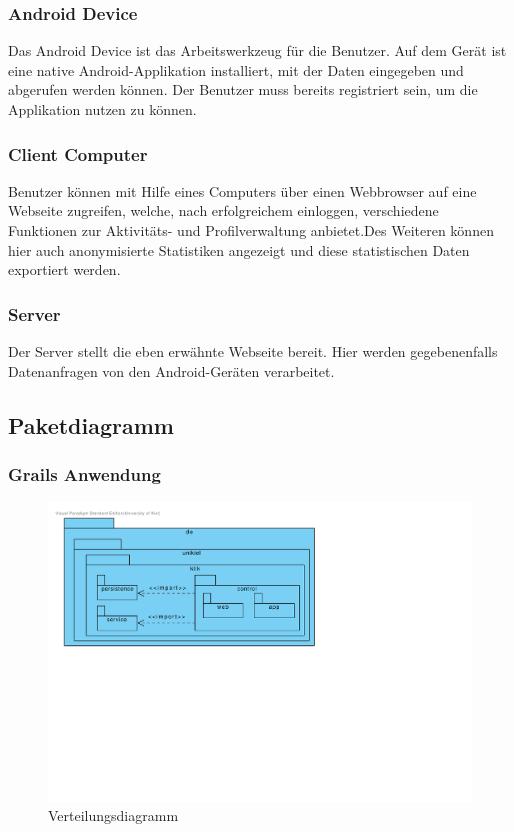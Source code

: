 \subsubsection{Android Device}
Das Android Device ist das Arbeitswerkzeug für die Benutzer. Auf dem
Gerät ist eine native Android-Applikation installiert, mit der Daten
eingegeben und abgerufen werden können. Der Benutzer muss bereits
registriert sein, um die Applikation nutzen zu können.

\subsubsection{Client Computer}
Benutzer können mit Hilfe eines Computers über einen Webbrowser auf eine Webseite zugreifen, welche, nach erfolgreichem einloggen, verschiedene Funktionen zur Aktivitäts- und Profilverwaltung anbietet.Des Weiteren können hier auch anonymisierte Statistiken angezeigt und diese statistischen Daten exportiert werden.

\subsubsection{Server}
Der Server stellt die eben erwähnte Webseite bereit. Hier werden gegebenenfalls Datenanfragen von den Android-Geräten verarbeitet.

\subsection{Paketdiagramm}

\subsubsection{Grails Anwendung}

\begin{figure}[H]
  \centering
  \includegraphics[width=\textwidth, trim=1cm 11cm 4cm 1cm, clip]{gfx/package_diagram}
  \caption{Verteilungsdiagramm}
\end{figure}

